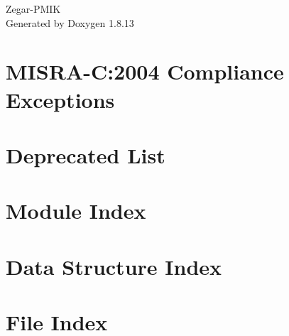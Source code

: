 \documentclass[twoside]{book}
\newcommand{\+}{\discretionary{\mbox{\scriptsize$\hookleftarrow$}}{}{}}
\newcommand{\clearemptydoublepage}{%
  \newpage{\pagestyle{empty}\cleardoublepage}%
}
\begin{document}
\hypersetup{pageanchor=false,
             bookmarksnumbered=true,
             pdfencoding=unicode
            }
\begin{titlepage}
\vspace*{7cm}
\begin{center}%
{\Large Zegar-\/\+P\+M\+IK }\\
\vspace*{1cm}
{\large Generated by Doxygen 1.8.13}\\
\end{center}
\end{titlepage}
\clearemptydoublepage
{}
\tableofcontents
\clearemptydoublepage
{}
\hypersetup{pageanchor=true}

\chapter{M\+I\+S\+R\+A-\/C\+:2004 Compliance Exceptions}
\label{_c_m_s_i_s__m_i_s_r_a__exceptions}

\chapter{Deprecated List}
\label{deprecated}

\chapter{Module Index}

\chapter{Data Structure Index}

\chapter{File Index}

\end{document}
